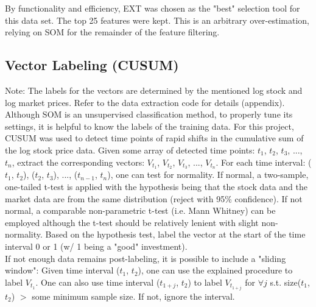 \documentclass[preprint,12pt]{elsarticle}
\begin{document}
By functionality and efficiency, EXT was chosen as the "best" selection tool for this data set. The top 25 features were kept. This is an arbitrary over-estimation, relying on SOM for the remainder of the feature filtering. 

\subsection{Vector Labeling (CUSUM)} 

Note: The labels for the vectors are determined by the mentioned log stock and log market prices. Refer to the data extraction code for details (appendix).\\

Although SOM is an unsupervised classification method, to properly tune its settings, it is helpful to know the labels of the training data. For this project, CUSUM was used to detect time points of rapid shifts in the cumulative sum of the log stock price data. Given some array of detected time points: $t_1$, $t_2$, $t_3$, ..., $t_n$, extract the corresponding vectors: $V_{t_1}$, $V_{t_2}$, $V_{t_3}$, ..., $V_{t_n}$. For each time interval: ($t_1$, $t_2$), ($t_2$, $t_3$), ..., ($t_{n-1}$, $t_n$), one can test for normality. If normal, a two-sample, one-tailed t-test is applied with the hypothesis being that the stock data and the market data are from the same distribution (reject with 95\% confidence). If not normal, a comparable non-parametric t-test (i.e. Mann Whitney) can be employed although the t-test should be relatively lenient with slight non-normality. Based on the hypothesis test, label the vector at the start of the time interval 0 or 1 (w/ 1 being a "good" investment). \\

If not enough data remains post-labeling, it is possible to include a "sliding window": Given time interval ($t_1$, $t_2$), one can use the explained procedure to label $V_{t_1}$. One can also use time interval ($t_{1+j}$, $t_2$) to label $V_{t_{1+j}}$ for $\forall{j}$ s.t. size($t_1$, $t_2$) $>$ some minimum sample size. If not, ignore the interval.\\
\end{document}
